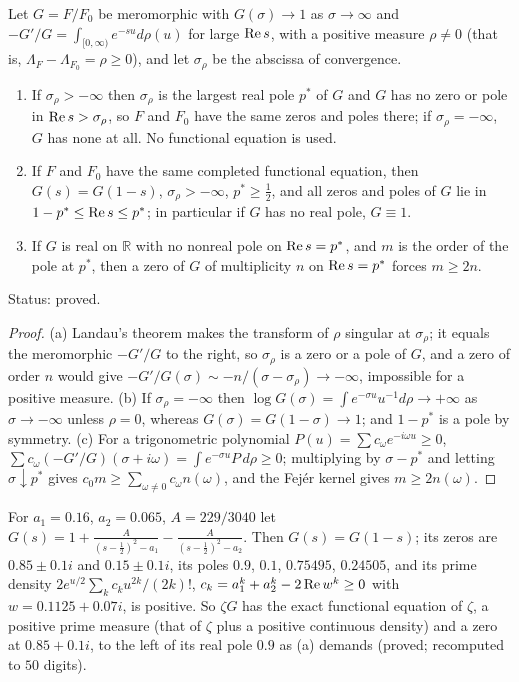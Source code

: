 \begin{proposition}\label{rg:prop:comparison}
Let $G=F/F_0$ be meromorphic with $G(\sigma)\to1$ as $\sigma\to\infty$ and $-G'/G=\int_{[0,\infty)}e^{-su}d\rho(u)$ for large $\operatorname{Re} s$, with a positive measure $\rho\ne0$ (that is, $\Lambda_F-\Lambda_{F_0}=\rho\ge0$), and let $\sigma_\rho$ be the abscissa of convergence.
\begin{enumerate}
\item[(a)] If $\sigma_\rho>-\infty$ then $\sigma_\rho$ is the largest real pole $p^*$ of $G$ and $G$ has no zero or pole in $\operatorname{Re} s>\sigma_\rho$, so $F$ and $F_0$ have the same zeros and poles there; if $\sigma_\rho=-\infty$, $G$ has none at all. No functional equation is used.
\item[(b)] If $F$ and $F_0$ have the same completed functional equation, then $G(s)=G(1-s)$, $\sigma_\rho>-\infty$, $p^*\ge\frac12$, and all zeros and poles of $G$ lie in $1-p^*\le\operatorname{Re} s\le p^*$; in particular if $G$ has no real pole, $G\equiv1$.
\item[(c)] If $G$ is real on $\mathbb R$ with no nonreal pole on $\operatorname{Re} s=p^*$, and $m$ is the order of the pole at $p^*$, then a zero of $G$ of multiplicity $n$ on $\operatorname{Re} s=p^*$ forces $m\ge2n$.
\end{enumerate}
Status: proved.
\end{proposition}

\begin{proof}
(a) Landau's theorem \cite{Widder41} makes the transform of $\rho$ singular at $\sigma_\rho$; it equals the meromorphic $-G'/G$ to the right, so $\sigma_\rho$ is a zero or a pole of $G$, and a zero of order $n$ would give $-G'/G(\sigma)\sim-n/(\sigma-\sigma_\rho)\to-\infty$, impossible for a positive measure. (b) If $\sigma_\rho=-\infty$ then $\log G(\sigma)=\int e^{-\sigma u}u^{-1}d\rho\to+\infty$ as $\sigma\to-\infty$ unless $\rho=0$, whereas $G(\sigma)=G(1-\sigma)\to1$; and $1-p^*$ is a pole by symmetry. (c) For a trigonometric polynomial $P(u)=\sum c_\omega e^{-i\omega u}\ge0$, $\sum c_\omega(-G'/G)(\sigma+i\omega)=\int e^{-\sigma u}P\,d\rho\ge0$; multiplying by $\sigma-p^*$ and letting $\sigma\downarrow p^*$ gives $c_0m\ge\sum_{\omega\ne0}c_\omega n(\omega)$, and the Fej\'er kernel gives $m\ge2n(\omega)$. \qedhere
\end{proof}

\begin{example}\label{rg:ex:Gb}
For $a_1=0.16$, $a_2=0.065$, $A=229/3040$ let $G(s)=1+\frac A{(s-\frac12)^2-a_1}-\frac A{(s-\frac12)^2-a_2}$. Then $G(s)=G(1-s)$; its zeros are $0.85\pm0.1i$ and $0.15\pm0.1i$, its poles $0.9$, $0.1$, $0.75495$, $0.24505$, and its prime density $2e^{u/2}\sum_kc_ku^{2k}/(2k)!$, $c_k=a_1^k+a_2^k-2\operatorname{Re} w^k\ge0$ with $w=0.1125+0.07i$, is positive. So $\zeta G$ has the exact functional equation of $\zeta$, a positive prime measure (that of $\zeta$ plus a positive continuous density) and a zero at $0.85+0.1i$, to the left of its real pole $0.9$ as (a) demands (proved; recomputed to $50$ digits).
\end{example}


